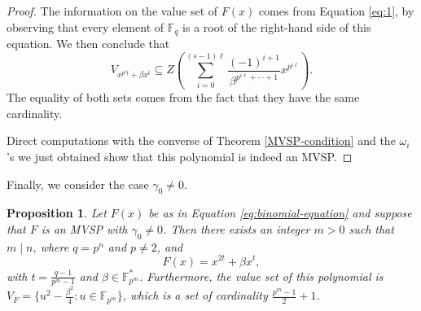 \documentclass[preprint,12pt]{elsarticle}
\newtheorem{proposition}[theorem]{Proposition}
\begin{document}
\begin{proof}
    The information on the value set of $F(x)$ comes from Equation \eqref{eq:1}, by observing that every element of $\mathbb{F}_q$ is a root of the right-hand side of this equation. We then conclude that
    $$V_{x^{p^{\ell}t}+\beta x^t} \subseteq Z\left(\sum_{i = 0}^{(s - 1)\ell}\frac{(-1)^{i + 1}}{\beta^{p^{i\ell} + \cdots + 1}}x^{p^{i\ell}}\right).$$
    The equality of both sets comes from the fact that they have the same cardinality.
    
    Direct computations with the converse of Theorem \ref{MVSP-condition} and the $\omega_i$'s we just obtained show that this polynomial is indeed an MVSP. 
\end{proof}

Finally, we consider the case $\gamma_0 \neq 0$.

\begin{proposition}\label{Vf>22}
    Let $F(x)$ be as in Equation \eqref{eq:binomial-equation} and suppose that $F$ is an MVSP with $\gamma_0 \neq 0$. Then there exists an integer $m > 0$ such that $m \mid n$, where $q = p^n$ and $p \neq 2$, and
    $$
    F(x) = x^{2t} + \beta x^t,
    $$
    with $t = \frac{q - 1}{p^m - 1}$ and $\beta \in \mathbb{F}_{p^m}^*$. Furthermore, the value set of this polynomial is $V_F = \{u^2 - \frac{\beta^2}{4} : u \in \mathbb{F}_{p^m}\}$, which is a set of cardinality $\frac{p^m-1}{2}+1$.
\end{proposition}
\end{document}
